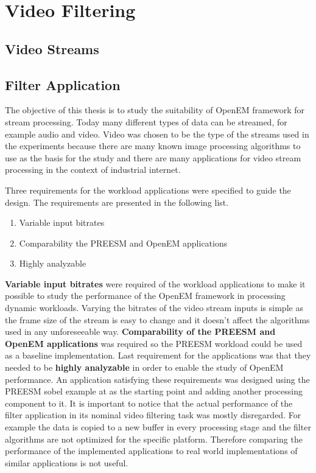 \chapter{Video Filtering}
\section{Video Streams}

\section{Filter Application}
\label{sec:filterapp}
The objective of this thesis is to study the suitability of OpenEM framework
for stream processing. Today many different types of data can be streamed, for
example audio and video. Video was chosen to be the type of the streams used in
the experiments because there are many known image processing algorithms to use
as the basis for the study and there are many applications for video stream
processing in the context of industrial internet. 

Three requirements for the workload applications were specified to guide the
design. The requirements are presented in the following list.

\begin{enumerate}
    \item{Variable input bitrates}
    \item{Comparability the PREESM and OpenEM applications}
    \item{Highly analyzable}
\end{enumerate}

\textbf{Variable input bitrates} were required of the workload applications to
make it possible to study the performance of the OpenEM framework in processing
dynamic workloads. Varying the bitrates of the video stream inputs is simple as
the frame size of the stream is easy to change and it doesn't affect the
algorithms used in any unforeseeable way. \textbf{Comparability of the PREESM
and OpenEM applications} was required so the PREESM workload could be used as a
baseline implementation. Last requirement for the applications was that they
needed to be \textbf{highly analyzable} in order to enable the study of OpenEM
performance. An application satisfying these requirements was designed using the
PREESM sobel example at \cite{preesmtut} as the starting point and adding
another processing component to it. It is important to notice that the actual
performance of the filter application in its nominal video filtering task was
mostly disregarded. For example the data is copied to a new buffer in every
processing stage and the filter algorithms are not optimized for the specific
platform. Therefore comparing the performance of the implemented applications to
real world implementations of similar applications is not useful.

